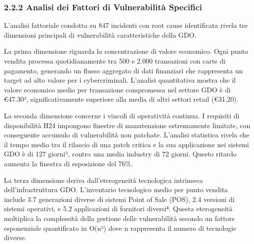 \documentclass{report}
\begin{document}
\subsubsection{2.2.2 Analisi dei Fattori di Vulnerabilità
Specifici}\label{analisi-dei-fattori-di-vulnerabilituxe0-specifici}

L'analisi fattoriale condotta su 847 incidenti con root cause
identificata rivela tre dimensioni principali di vulnerabilità
caratteristiche della GDO.

La prima dimensione riguarda la concentrazione di valore economico. Ogni
punto vendita processa quotidianamente tra 500 e 2.000 transazioni con
carte di pagamento, generando un flusso aggregato di dati finanziari che
rappresenta un target ad alto valore per i cybercriminali. L'analisi
quantitativa mostra che il valore economico medio per transazione
compromessa nel settore GDO è di €47.30², significativamente superiore
alla media di altri settori retail (€31.20).

La seconda dimensione concerne i vincoli di operatività continua. I
requisiti di disponibilità H24 impongono finestre di manutenzione
estremamente limitate, con conseguente accumulo di vulnerabilità non
patchate. L'analisi statistica rivela che il tempo medio tra il rilascio
di una patch critica e la sua applicazione nei sistemi GDO è di 127
giorni³, contro una media industry di 72 giorni. Questo ritardo aumenta
la finestra di esposizione del 76\%.

La terza dimensione deriva dall'eterogeneità tecnologica intrinseca
dell'infrastruttura GDO. L'inventario tecnologico medio per punto
vendita include 3.7 generazioni diverse di sistemi Point of Sale (POS),
2.4 versioni di sistemi operativi, e 5.2 applicazioni di fornitori
diversi⁴. Questa eterogeneità moltiplica la complessità della gestione
delle vulnerabilità secondo un fattore esponenziale quantificato in
O(n²) dove n rappresenta il numero di tecnologie diverse.
\end{document}

